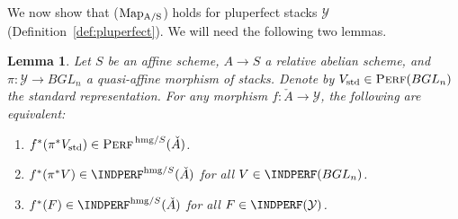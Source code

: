 \documentclass[12pt, oneside]{amsart}
\numberwithin{equation}{section}
\newtheorem{lemma}[subsubsection]{Lemma}
\theoremstyle{remark}
\theoremstyle{plain}
\DeclareMathOperator{\Perf}{\textsc{Perf}}
\newcommand{\YY}{\mathcal{Y}}
\begin{document}
We now show that ($\textup{Map}\textsubscript{A/S}$) holds for pluperfect stacks $\YY$ (Definition~\ref{def:pluperfect}).
We will need the following two lemmas.

\begin{lemma}\label{lem:std suff for hmg}
  Let $S$ be an affine scheme, $A \to S$ a relative abelian scheme, and $\pi : \YY \to BGL_n$ a quasi-affine morphism of stacks.
  Denote by $V_{\mathrm{std}} \in \Perf(BGL_n)$ the standard representation.
  For any morphism $f : \check{A} \to \YY$, the following are equivalent:
  \begin{enumerate}
    \item $f^*(\pi^* V_{\mathrm{std}}) \in \Perf^{\,\mathrm{hmg}/S}(\check{A})$.
    \item $f^*(\pi^* V) \in \INDPERF^{\mathrm{hmg}/S}(\check{A})$ for all $V \in \INDPERF(BGL_n)$.
    \item $f^*(F) \in \INDPERF^{\mathrm{hmg}/S}(\check{A})$ for all $F \in \INDPERF(\YY)$.
  \end{enumerate}
\end{lemma}
\end{document}
